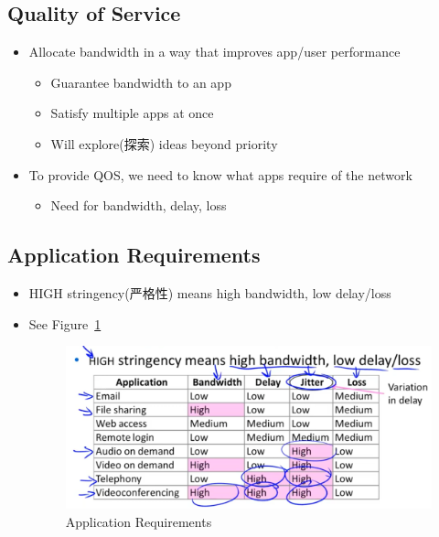 \documentclass[12pt]{ctexart}   %
\begin{document}
	\subsection{Quality of Service}
	\begin{itemize}
		\item Allocate bandwidth in a way that improves app/user performance
		\begin{itemize}
			\item Guarantee bandwidth to an app
			\item Satisfy multiple apps at once
			\item Will explore(探索) ideas beyond priority
		\end{itemize}
		
		\item To provide QOS, we need to know what apps require of the network
		\begin{itemize}
			\item Need for bandwidth, delay, loss
		\end{itemize}
	\end{itemize}
	
	\subsection{Application Requirements}
	\begin{itemize}
		\item HIGH stringency(严格性) means high bandwidth, low delay/loss
		\item See Figure~\ref{fig:9-1-7}
		  
		 \begin{figure}[h!] %
		\centering
		 \includegraphics[scale=0.7]{images/9-1-7}
		\caption{ Application Requirements }
		 \label{fig:9-1-7}
		 \end{figure}
	\end{itemize}
	
\end{document}
